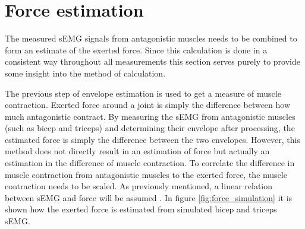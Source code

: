 \section{Force estimation}\label{section:force_estimation}

The measured sEMG signals from antagonistic muscles needs to be combined to form an estimate of the exerted force. Since this calculation is done in a consistent way throughout all measurements this section serves purely to provide some insight into the method of calculation.

The previous step of envelope estimation is used to get a measure of muscle contraction. Exerted force around a joint is simply the difference between how much antagonistic contract. By measuring the sEMG from antagonistic muscles (such as bicep and triceps) and determining their envelope after processing, the estimated force is simply the difference between the two envelopes. However, this method does not directly result in an estimation of force but actually an estimation in the difference of muscle contraction. To correlate the difference in muscle contraction from antagonistic muscles to the exerted force, the muscle contraction needs to be scaled. As previously mentioned, a linear relation between sEMG and force will be assumed \cite{adaptive_filter_dry_electrode} \cite{interpreting_muscle_function_from_emg}. In figure \ref{fig:force_simulation} it is shown how the exerted force is estimated from simulated bicep and triceps sEMG. 

